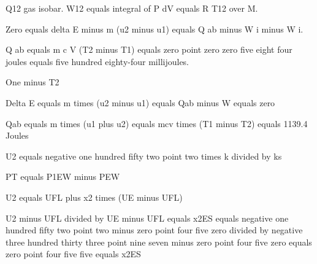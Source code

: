 Q12 gas isobar. W12 equals integral of P dV equals R T12 over M. 

Zero equals delta E minus m (u2 minus u1) equals Q ab minus W i minus W i.

Q ab equals m c V (T2 minus T1) equals zero point zero zero five eight four joules equals five hundred eighty-four millijoules.

One minus T2

Delta E equals m times (u2 minus u1) equals Qab minus W equals zero

Qab equals m times (u1 plus u2) equals mcv times (T1 minus T2) equals 1139.4 Joules

U2 equals negative one hundred fifty two point two times k divided by ks

PT equals P1EW minus PEW

U2 equals UFL plus x2 times (UE minus UFL)

U2 minus UFL divided by UE minus UFL equals x2ES equals negative one hundred fifty two point two minus zero point four five zero divided by negative three hundred thirty three point nine seven minus zero point four five zero equals zero point four five five equals x2ES